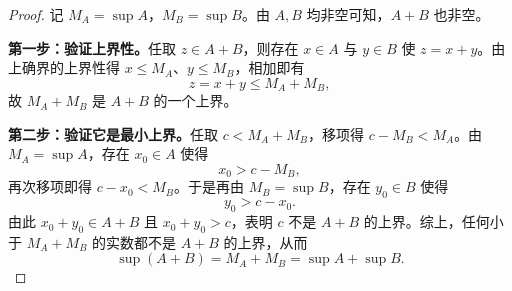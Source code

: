 \documentclass[UTF8, fontset=fandol, a4paper, 12pt]{ctexart}
\theoremstyle{definition}
\begin{document}
\begin{proof}
记 $M_A=\sup A$，$M_B=\sup B$。由 $A,B$ 均非空可知，$A+B$ 也非空。

\textbf{第一步：验证上界性。}任取 $z\in A+B$，则存在 $x\in A$ 与 $y\in B$ 使 $z=x+y$。由上确界的上界性得 $x\le M_A$、$y\le M_B$，相加即有
\[
  z=x+y\le M_A+M_B,
\]
故 $M_A+M_B$ 是 $A+B$ 的一个上界。

\medskip
\textbf{第二步：验证它是最小上界。}任取 $c<M_A+M_B$，移项得 $c-M_B<M_A$。由 $M_A=\sup A$，存在 $x_0\in A$ 使得
\[
  x_0>c-M_B,
\]
再次移项即得 $c-x_0<M_B$。于是再由 $M_B=\sup B$，存在 $y_0\in B$ 使得
\[
  y_0>c-x_0.
\]
由此 $x_0+y_0\in A+B$ 且 $x_0+y_0>c$，表明 $c$ 不是 $A+B$ 的上界。综上，任何小于 $M_A+M_B$ 的实数都不是 $A+B$ 的上界，从而
\[
  \sup(A+B)=M_A+M_B=\sup A+\sup B.
\]
\end{proof}
\end{document}

